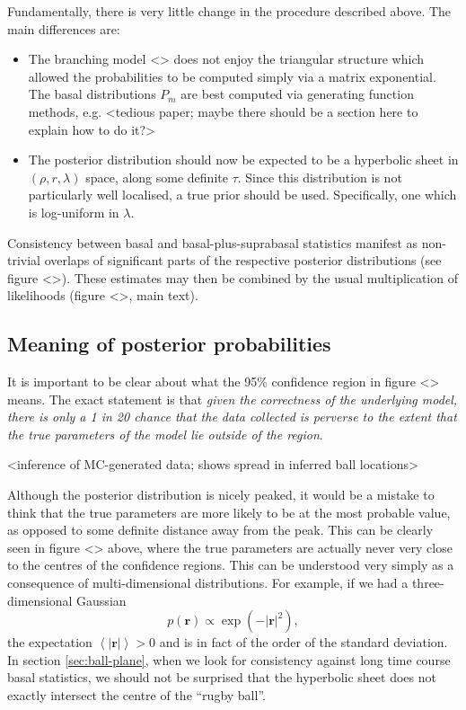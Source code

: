 \documentclass[10pt,UKenglish]{article}
\begin{document}
Fundamentally, there is very little change in the procedure described above. The main differences are:

\begin{itemize}
\item The branching model <> does not enjoy the triangular structure which allowed the probabilities to be computed simply via a matrix exponential. The basal distributions $P_m$ are best computed via generating function methods, e.g. <tedious paper; maybe there should be a section here to explain how to do it?>
\item The posterior distribution should now be expected to be a hyperbolic sheet in $(\rho, r, \lambda)$ space, along some definite $\tau$. Since this distribution is not particularly well localised, a true prior should be used. Specifically, one which is log-uniform in $\lambda$.
\end{itemize}

Consistency between basal and basal-plus-suprabasal statistics manifest as non-trivial overlaps of significant parts of the respective posterior distributions (see figure <>). These estimates may then be combined by the usual multiplication of likelihoods (figure <>, main text).

\subsection{Meaning of posterior probabilities}

It is important to be clear about what the 95\% confidence region in figure <> means. The exact statement is that \emph{given the correctness of the underlying model, there is only a 1 in 20 chance that the data collected is perverse to the extent that the true parameters of the model lie outside of the region}.

<inference of MC-generated data; shows spread in inferred ball locations>

Although the posterior distribution is nicely peaked, it would be a mistake to think that the true parameters are more likely to be at the most probable value, as opposed to some definite distance away from the peak. This can be clearly seen in figure <> above, where the true parameters are actually never very close to the centres of the confidence regions. This can be understood very simply as a consequence of multi-dimensional distributions. For example, if we had a three-dimensional Gaussian $$p(\mathbf{r}) \propto \exp(-|\mathbf r|^2),$$ the expectation $\left\langle \mathbf |\mathbf r| \right\rangle > 0$ and is in fact of the order of the standard deviation. In section \ref{sec:ball-plane}, when we look for consistency against long time course basal statistics, we should not be surprised that the hyperbolic sheet does not exactly intersect the centre of the ``rugby ball''.
\end{document}
